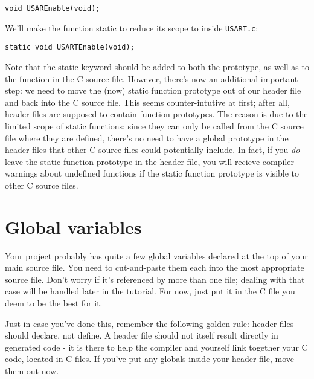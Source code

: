 \documentclass[a4paper,oneside,notitlepage]{article}
\begin{document}
\begin{center}
\begin{lstlisting}
void USAREnable(void);
\end{lstlisting}
\end{center}

We'll make the function static to reduce its scope to inside \texttt{USART.c}:

\begin{center}
\begin{lstlisting}
static void USARTEnable(void);
\end{lstlisting}
\end{center}

Note that the static keyword should be added to both the prototype, as well as to the function in the C source file. However, there's now an additional important step: we need to move the (now) static function prototype out of our header file and back into the C source file. This seems counter-intutive at first; after all, header files are supposed to contain function prototypes. The reason is due to the limited scope of static functions; since they can only be called from the C source file where they are defined, there's no need to have a global prototype in the header files that other C source files could potentially include. In fact, if you \textit{do} leave the static function prototype in the header file, you will recieve compiler warnings about undefined functions if the static function prototype is visible to other C source files.

\section{Global variables}

Your project probably has quite a few global variables declared at the top of your main source file. You need to cut-and-paste them each into the most appropriate source file. Don't worry if it's referenced by more than one file; dealing with that case will be handled later in the tutorial. For now, just put it in the C file you deem to be the best for it.

Just in case you've done this, remember the following golden rule: header files should declare, not define. A header file should not itself result directly in generated code - it is there to help the compiler and yourself link together your C code, located in C files. If you've put any globals inside your header file, move them out now.
\end{document}
